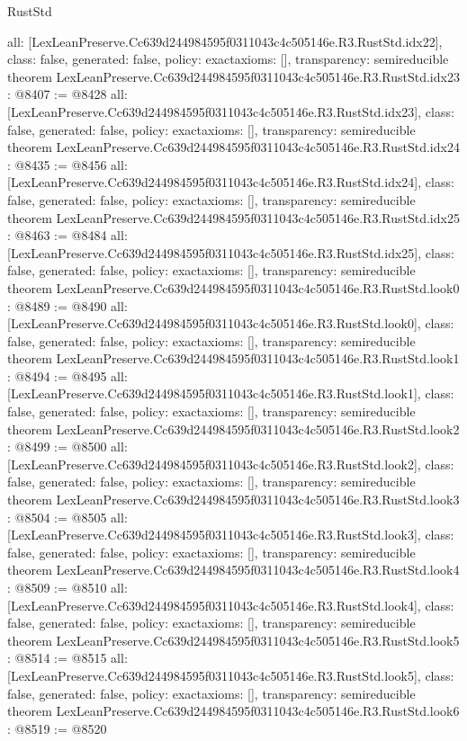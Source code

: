 \begin{lexlean}{RustStd}
\begin{coremodule}
{  all: [LexLeanPreserve.Cc639d244984595f0311043c4c505146e.R3.RustStd.idx22],
  class: false,
  generated: false,
  policy: exact{axioms: []},
  transparency: semireducible
}
theorem LexLeanPreserve.Cc639d244984595f0311043c4c505146e.R3.RustStd.idx23 : @8407 := @8428 {
  all: [LexLeanPreserve.Cc639d244984595f0311043c4c505146e.R3.RustStd.idx23],
  class: false,
  generated: false,
  policy: exact{axioms: []},
  transparency: semireducible
}
theorem LexLeanPreserve.Cc639d244984595f0311043c4c505146e.R3.RustStd.idx24 : @8435 := @8456 {
  all: [LexLeanPreserve.Cc639d244984595f0311043c4c505146e.R3.RustStd.idx24],
  class: false,
  generated: false,
  policy: exact{axioms: []},
  transparency: semireducible
}
theorem LexLeanPreserve.Cc639d244984595f0311043c4c505146e.R3.RustStd.idx25 : @8463 := @8484 {
  all: [LexLeanPreserve.Cc639d244984595f0311043c4c505146e.R3.RustStd.idx25],
  class: false,
  generated: false,
  policy: exact{axioms: []},
  transparency: semireducible
}
theorem LexLeanPreserve.Cc639d244984595f0311043c4c505146e.R3.RustStd.look0 : @8489 := @8490 {
  all: [LexLeanPreserve.Cc639d244984595f0311043c4c505146e.R3.RustStd.look0],
  class: false,
  generated: false,
  policy: exact{axioms: []},
  transparency: semireducible
}
theorem LexLeanPreserve.Cc639d244984595f0311043c4c505146e.R3.RustStd.look1 : @8494 := @8495 {
  all: [LexLeanPreserve.Cc639d244984595f0311043c4c505146e.R3.RustStd.look1],
  class: false,
  generated: false,
  policy: exact{axioms: []},
  transparency: semireducible
}
theorem LexLeanPreserve.Cc639d244984595f0311043c4c505146e.R3.RustStd.look2 : @8499 := @8500 {
  all: [LexLeanPreserve.Cc639d244984595f0311043c4c505146e.R3.RustStd.look2],
  class: false,
  generated: false,
  policy: exact{axioms: []},
  transparency: semireducible
}
theorem LexLeanPreserve.Cc639d244984595f0311043c4c505146e.R3.RustStd.look3 : @8504 := @8505 {
  all: [LexLeanPreserve.Cc639d244984595f0311043c4c505146e.R3.RustStd.look3],
  class: false,
  generated: false,
  policy: exact{axioms: []},
  transparency: semireducible
}
theorem LexLeanPreserve.Cc639d244984595f0311043c4c505146e.R3.RustStd.look4 : @8509 := @8510 {
  all: [LexLeanPreserve.Cc639d244984595f0311043c4c505146e.R3.RustStd.look4],
  class: false,
  generated: false,
  policy: exact{axioms: []},
  transparency: semireducible
}
theorem LexLeanPreserve.Cc639d244984595f0311043c4c505146e.R3.RustStd.look5 : @8514 := @8515 {
  all: [LexLeanPreserve.Cc639d244984595f0311043c4c505146e.R3.RustStd.look5],
  class: false,
  generated: false,
  policy: exact{axioms: []},
  transparency: semireducible
}
theorem LexLeanPreserve.Cc639d244984595f0311043c4c505146e.R3.RustStd.look6 : @8519 := @8520 {
}
\end{coremodule}
\end{lexlean}

